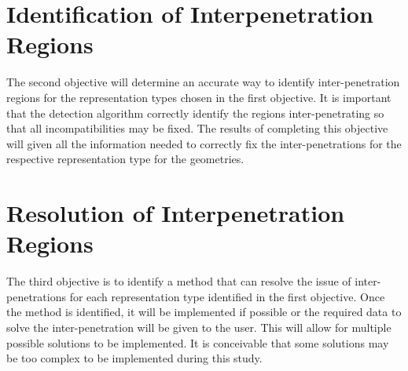 \section{Identification of Interpenetration Regions}

The second objective will determine an accurate way to identify inter-penetration regions for the representation types chosen in the first objective. It is important that the detection algorithm correctly identify the regions inter-penetrating so that all incompatibilities may be fixed. The results of completing this objective will given all the information needed to correctly fix the inter-penetrations for the respective representation type for the geometries. 

\section{Resolution of Interpenetration Regions}

The third objective is to identify a method that can resolve the issue of inter-penetrations for each representation type identified in the first objective. Once the method is identified, it will be implemented if possible or the required data to solve the inter-penetration will be given to the user. This will allow for multiple possible solutions to be implemented. It is conceivable that some solutions may be too complex to be implemented during this study.
